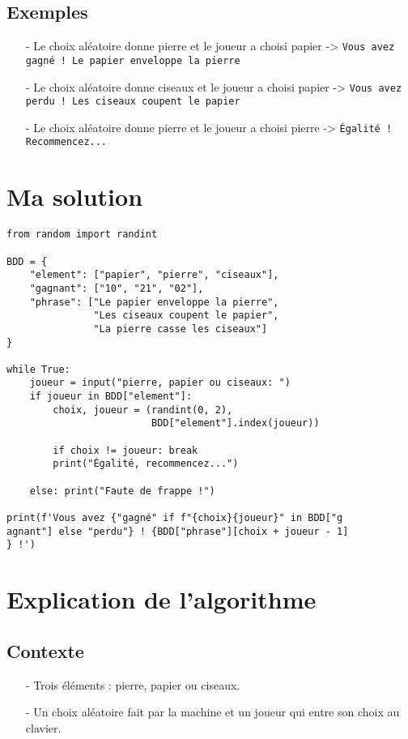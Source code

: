 \subsection*{Exemples}
\begin{itemize}
	\item[-] Le choix aléatoire donne \og pierre\fg{} et le joueur a choisi \og papier\fg{} -> \texttt{Vous avez gagné ! Le papier enveloppe la pierre}
	\item[-] Le choix aléatoire donne \og ciseaux\fg{} et le joueur a choisi \og papier\fg{} -> \texttt{Vous avez perdu ! Les ciseaux coupent le papier}
	\item[-] Le choix aléatoire donne \og pierre\fg{} et le joueur a choisi \og pierre\fg{} -> \texttt{Égalité ! Recommencez...}
\end{itemize}
\medskip

\section{Ma solution}
\begin{lstlisting}
from random import randint

BDD = {
    "element": ["papier", "pierre", "ciseaux"],
    "gagnant": ["10", "21", "02"],
    "phrase": ["Le papier enveloppe la pierre",
               "Les ciseaux coupent le papier",
               "La pierre casse les ciseaux"]
}

while True:
    joueur = input("pierre, papier ou ciseaux: ")
    if joueur in BDD["element"]:
        choix, joueur = (randint(0, 2),
                         BDD["element"].index(joueur))

        if choix != joueur: break
        print("Égalité, recommencez...")

    else: print("Faute de frappe !")

print(f'Vous avez {"gagné" if f"{choix}{joueur}" in BDD["g
agnant"] else "perdu"} ! {BDD["phrase"][choix + joueur - 1]
} !')
\end{lstlisting}
\medskip

\section{Explication de l'algorithme}
\subsection*{Contexte}
\begin{itemize}
	\item[-] Trois éléments : \og pierre\fg{}, \og papier\fg{} ou \og ciseaux\fg{}.
	\item[-] Un choix aléatoire fait par la machine et un joueur qui entre son choix au clavier.
\end{itemize}
\medskip

